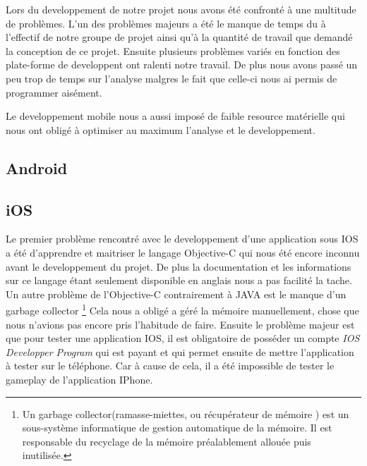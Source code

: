 Lors du developpement de notre projet nous avons été confronté à une multitude de problèmes. L'un des problèmes majeurs a été le manque de temps du à l'effectif de notre groupe de projet ainsi qu'à la quantité de travail que demandé la conception de ce projet. Ensuite plusieurs problèmes variés en fonction des plate-forme de developpent ont ralenti notre travail. De plus nous avons passé un peu trop de temps sur l'analyse malgres le fait que celle-ci nous ai permis de programmer aisément.

Le developpement mobile nous a aussi imposé de faible resource matérielle qui nous ont obligé à optimiser au maximum l'analyse et le developpement.


\subsection{Android}

\subsection{iOS}

Le premier problème rencontré avec le developpement d'une application sous IOS a été d'apprendre et maitriser le langage Objective-C qui nous été encore inconnu avant le developpement du projet. De plus la documentation et les informations sur ce langage étant seulement disponible en anglais nous a pas facilité la tache.
Un autre problème de l'Objective-C contrairement à JAVA est le manque d'un garbage collector \footnote{Un garbage collector(ramasse-miettes, ou récupérateur de mémoire ) est un sous-système informatique de gestion automatique de la mémoire. Il est responsable du recyclage de la mémoire préalablement allouée puis inutilisée.} Cela nous a obligé a géré la mémoire manuellement, chose que nous n'avions pas encore pris l'habitude de faire.
Ensuite le problème majeur est que pour tester une application IOS, il est obligatoire de posséder un compte \textit{IOS Developper Program} qui est payant et qui permet ensuite de mettre l'application à tester sur le téléphone. Car à cause de cela, il a été impossible de tester le gameplay de l'application IPhone.
